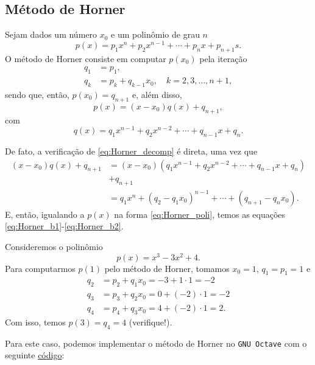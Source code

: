 \subsection{Método de Horner}

Sejam dados um número $x_0$ e um polinômio de grau $n$
\begin{equation}\label{eq:Horner_poli}
  p(x) = p_1x^n + p_2x^{n-1} + \cdots + p_{n}x + p_{n+1}s.
\end{equation}
O método de Horner consiste em computar $p(x_0)$ pela iteração
\begin{align}
  q_1 &= p_1,\label{eq:Horner_b1}\\
  q_{k} &= p_k + q_{k-1}x_0,\quad k=2,3,\dotsc,n+1,\label{eq:Horner_b2}
\end{align}
sendo que, então, $p(x_0) = q_{n+1}$ e, além disso,
\begin{equation}\label{eq:Horner_decomp}
  p(x) = (x-x_0)q(x) + q_{n+1},
\end{equation}
com
\begin{equation}
  q(x) = q_1x^{n-1} + q_2x^{n-2} + \cdots + q_{n-1}x + q_{n}.
\end{equation}

De fato, a verificação de \eqref{eq:Horner_decomp} é direta, uma vez que
\begin{align}
  (x-x_0)q(x)+q_{n+1} &= (x-x_0)(q_1x^{n-1} + q_2x^{n-2} + \cdots + q_{n-1}x + q_{n})\nonumber\\ 
                      &+ q_{n+1}\\
                      &= q_1x^n + (q_2-q_1x_0)^{n-1} + \cdots + (q_{n+1}-q_{n}x_0).
\end{align}
E, então, igualando a $p(x)$ na forma \eqref{eq:Horner_poli}, temos as equações \eqref{eq:Horner_b1}-\eqref{eq:Horner_b2}.

\begin{ex}\label{ex:Horner_exec}
  Consideremos o polinômio
  \begin{equation}
    p(x) = x^3 - 3x^2 + 4.
  \end{equation}
  Para computarmos $p(1)$ pelo método de Horner, tomamos $x_0=1$, $q_1=p_1=1$ e
  \begin{align}
    q_2 &= p_2 + q_1x_0 = -3 + 1\cdot 1 = -2\\
    q_3 &= p_3 + q_2x_0 = 0 + (-2)\cdot 1 = -2\\
    q_4 &= p_4 + q_3x_0 = 4 + (-2)\cdot 1 = 2.
  \end{align}
Com isso, temos $p(3) = q_4 = 4$ (verifique!).

\ifisoctave
Para este caso, podemos implementar o método de Horner no \verb+GNU Octave+ com o seguinte \href{https://github.com/phkonzen/notas/blob/master/src/MatematicaNumerica/cap_eq1d/dados/ex_Horner_exec/ex_Horner_exec.m}{código}:

\fi
\end{ex}

